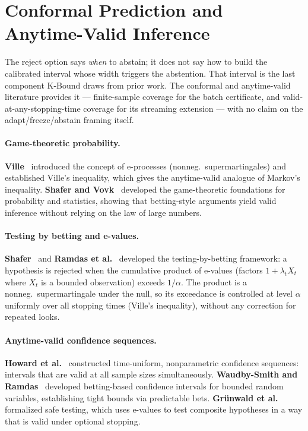 \section{Conformal Prediction and Anytime-Valid Inference}\label{sec:rel-conformal}

The reject option says \emph{when} to abstain; it does not say how to build the
calibrated interval whose width triggers the abstention. That interval is the
last component K-Bound draws from prior work. The conformal and anytime-valid
literature provides it --- finite-sample coverage for the batch certificate, and
valid-at-any-stopping-time coverage for its streaming extension --- with no claim
on the adapt/freeze/abstain framing itself.

\paragraph{Game-theoretic probability.}
\textbf{Ville}~\cite{ville1939etude} introduced the concept of e-processes
(nonneg.\ supermartingales) and established Ville's inequality, which gives
the anytime-valid analogue of Markov's inequality.
\textbf{Shafer and Vovk}~\cite{shafer2019game} developed the game-theoretic
foundations for probability and statistics, showing that betting-style
arguments yield valid inference without relying on the law of large numbers.

\paragraph{Testing by betting and e-values.}
\textbf{Shafer}~\cite{shafer2019game} and \textbf{Ramdas et al.}\
\cite{ramdas2023gametheoretic} developed the testing-by-betting framework:
a hypothesis is rejected when the cumulative product of e-values (factors
$1 + \lambda_t X_t$ where $X_t$ is a bounded observation) exceeds $1/\alpha$.
The product is a nonneg.\ supermartingale under the null, so its exceedance
is controlled at level $\alpha$ uniformly over all stopping times (Ville's
inequality), without any correction for repeated looks.

\paragraph{Anytime-valid confidence sequences.}
\textbf{Howard et al.}~\cite{howard2021timeuniform} constructed
time-uniform, nonparametric confidence sequences: intervals that are valid
at all sample sizes simultaneously.
\textbf{Waudby-Smith and Ramdas}~\cite{waudbysmith2024betting} developed
betting-based confidence intervals for bounded random variables, establishing
tight bounds via predictable bets.
\textbf{Gr\"unwald et al.}~\cite{grunwald2024safe} formalized safe testing,
which uses e-values to test composite hypotheses in a way that is valid
under optional stopping.

